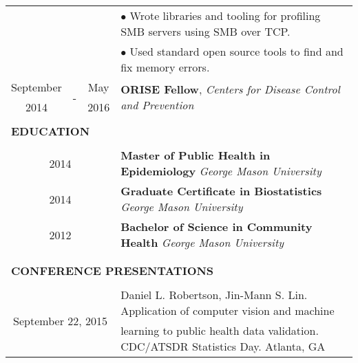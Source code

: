 \documentclass[10pt]{article}
\begin{document}
\begin{table}[ht]
\begin{tabular}{@{\hspace{0mm}}c@{\hspace{1mm}}c@{\hspace{3mm}}cl}
            & & & $\bullet$ Wrote libraries and tooling for profiling SMB servers using SMB over TCP.\\
            & & & $\bullet$ Used standard open source tools to find and fix memory errors.\\
            September & \multirow{2}{*}{-} & May & \multirow{2}{*}{\textbf{ORISE Fellow}, \textit{Centers for Disease Control and Prevention}}\\
            2014 & & 2016 &\\
            \hline\\[-3mm]
            \multicolumn{4}{l}{\large{\textbf{EDUCATION}}}\\
            \hline\\[-2mm]
            \multicolumn{3}{c}{2014} & \textbf{Master of Public Health in Epidemiology} \textit{George Mason University}\\[1mm]
            \multicolumn{3}{c}{2014} & \textbf{Graduate Certificate in Biostatistics} \textit{George Mason University}\\[1mm]
            \multicolumn{3}{c}{2012} & \textbf{Bachelor of Science in Community Health} \textit{George Mason University}\\\\[-2mm]
            \hline\\[-3mm]
            \multicolumn{4}{l}{\large{\textbf{CONFERENCE PRESENTATIONS}}}\\
            \hline\\[-2mm]
            \multicolumn{3}{c}{\multirow{2}{*}{September 22, 2015}} & Daniel L. Robertson, Jin-Mann S. Lin. Application of computer vision and machine\\
            & & & learning to public health data validation. CDC/ATSDR Statistics Day. Atlanta, GA\\
        \end{tabular}
    \end{table}
\end{document}
